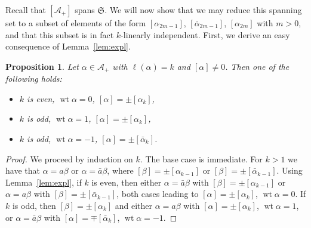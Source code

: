 \documentclass{article}
\def\fS{\mathfrak{S}}
\def\sA{\mathcal{A}}
\DeclareMathOperator{\wt}{\mathrm{wt}}
\newtheorem{prop}{Proposition}
\theoremstyle{definition}
\begin{document}
\subsubsection{}
Recall that $[\sA_+]$ spans $\fS$.
We will now show that we may reduce this spanning set
to a subset of elements of the form
$[\alpha_{2m-1}]$, $[\bar\alpha_{2m-1}]$, $[\alpha_{2m}]$
with $m>0$, and that this subset is in fact $k$-linearly independent. 
First, we derive an easy consequence of Lemma~\ref{lem:expl}.
\begin{prop}\label{prop:rel}
        Let $\alpha\in\sA_+$ with $\ell(\alpha)=k$ and $[\alpha]\neq0$. 
        Then one of the following holds:
        \begin{itemize}
        \item $k$ is even, $\wt\alpha=0$, $[\alpha]=\pm[\alpha_k]$,
        \item $k$ is odd, $\wt\alpha=1$, $[\alpha]=\pm[\alpha_k]$,
        \item $k$ is odd, $\wt\alpha=-1$, $[\alpha]=\pm[\bar\alpha_k]$.
        \end{itemize}
\end{prop}
\begin{proof}
        We proceed by induction on $k$.
        The base case is immediate.
        For $k>1$
        we have that $\alpha = a\beta$
        or $\alpha = \bar a \beta$,
        where $[\beta] = \pm [\alpha_{k-1}]$ or $[\beta] = \pm [\bar\alpha_{k-1}]$.
        Using Lemma~\ref{lem:expl},
        if $k$ is even, then either $\alpha=\bar a\beta$ with $[\beta]=\pm[\alpha_{k-1}]$
        or $\alpha=a\beta$ with $[\beta]=\pm[\bar\alpha_{k-1}]$, both cases
        leading to $[\alpha]=\pm[\alpha_k]$, $\wt\alpha=0$.
        If $k$ is odd, then $[\beta]=\pm[\alpha_k]$ and either
        $\alpha = a\beta$ with $[\alpha]=\pm[\alpha_k]$, $\wt\alpha=1$,
        or $\alpha=\bar a\beta$ with $[\alpha]=\mp[\bar\alpha_k]$, $\wt\alpha=-1$.
\end{proof}
\end{document}
